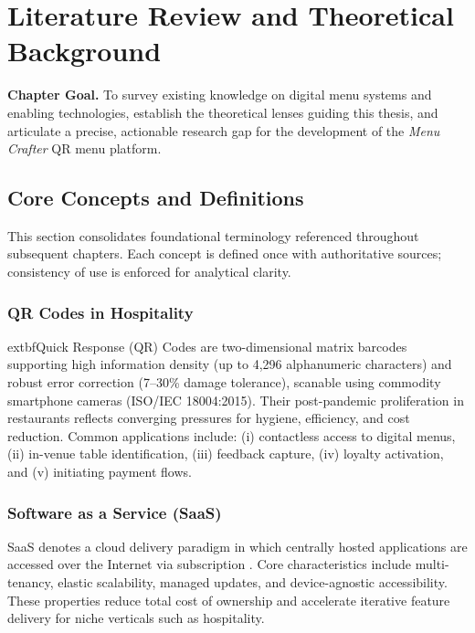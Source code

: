 \chapter{Literature Review and Theoretical Background}
\label{chap:litreview}

\noindent\textbf{Chapter Goal.} To survey existing knowledge on digital menu systems and enabling technologies, establish the theoretical lenses guiding this thesis, and articulate a precise, actionable research gap for the development of the \emph{Menu Crafter} QR menu platform.

\section{Core Concepts and Definitions}\label{sec:concepts}
This section consolidates foundational terminology referenced throughout subsequent chapters. Each concept is defined once with authoritative sources; consistency of use is enforced for analytical clarity.

\subsection{QR Codes in Hospitality}
	extbf{Quick Response (QR) Codes} are two-dimensional matrix barcodes supporting high information density (up to 4{,}296 alphanumeric characters) and robust error correction (7--30\% damage tolerance), scanable using commodity smartphone cameras (ISO/IEC 18004:2015). Their post-pandemic proliferation in restaurants reflects converging pressures for hygiene, efficiency, and cost reduction. Common applications include: (i) contactless access to digital menus, (ii) in-venue table identification, (iii) feedback capture, (iv) loyalty activation, and (v) initiating payment flows.

\subsection{Software as a Service (SaaS)}
SaaS denotes a cloud delivery paradigm in which centrally hosted applications are accessed over the Internet via subscription \cite{laudon2015}. Core characteristics include multi-tenancy, elastic scalability, managed updates, and device-agnostic accessibility. These properties reduce total cost of ownership and accelerate iterative feature delivery for niche verticals such as hospitality.

